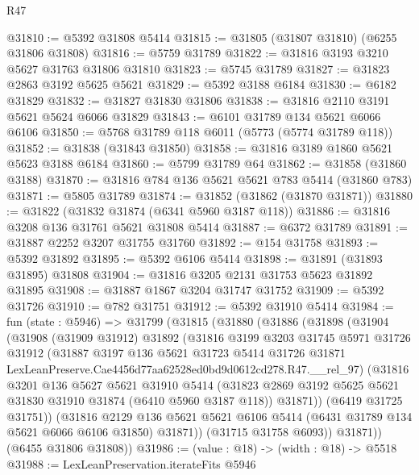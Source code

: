 \begin{lexlean}{R47}
\begin{coremodule}
@31810 := @5392 @31808 @5414
@31815 := @31805 (@31807 @31810) (@6255 @31806 @31808)
@31816 := @5759 @31789
@31822 := @31816 @3193 @3210 @5627 @31763 @31806 @31810
@31823 := @5745 @31789
@31827 := @31823 @2863 @3192 @5625 @5621
@31829 := @5392 @3188 @6184
@31830 := @6182 @31829
@31832 := @31827 @31830 @31806
@31838 := @31816 @2110 @3191 @5621 @5624 @6066 @31829
@31843 := @6101 @31789 @134 @5621 @6066 @6106
@31850 := @5768 @31789 @118 @6011 (@5773 (@5774 @31789 @118))
@31852 := @31838 (@31843 @31850)
@31858 := @31816 @3189 @1860 @5621 @5623 @3188 @6184
@31860 := @5799 @31789 @64
@31862 := @31858 (@31860 @3188)
@31870 := @31816 @784 @136 @5621 @5621 @783 @5414 (@31860 @783)
@31871 := @5805 @31789
@31874 := @31852 (@31862 (@31870 @31871))
@31880 := @31822 (@31832 @31874 (@6341 @5960 @3187 @118))
@31886 := @31816 @3208 @136 @31761 @5621 @31808 @5414
@31887 := @6372 @31789
@31891 := @31887 @2252 @3207 @31755 @31760
@31892 := @154 @31758
@31893 := @5392 @31892
@31895 := @5392 @6106 @5414
@31898 := @31891 (@31893 @31895) @31808
@31904 := @31816 @3205 @2131 @31753 @5623 @31892 @31895
@31908 := @31887 @1867 @3204 @31747 @31752
@31909 := @5392 @31726
@31910 := @782 @31751
@31912 := @5392 @31910 @5414
@31984 := fun (state : @5946) =>
  @31799
    (@31815
      (@31880
        (@31886
          (@31898
            (@31904
              (@31908
                (@31909 @31912)
                @31892
                (@31816
                  @3199
                  @3203
                  @31745
                  @5971
                  @31726
                  @31912
                  (@31887
                    @3197
                    @136
                    @5621
                    @31723
                    @5414
                    @31726
                    @31871
                    LexLeanPreserve.Cae4456d77aa62528ed0bd9d0612cd278.R47.__rel_97)
                  (@31816
                    @3201
                    @136
                    @5627
                    @5621
                    @31910
                    @5414
                    (@31823 @2869 @3192 @5625 @5621 @31830 @31910 @31874 (@6410 @5960 @3187 @118))
                    @31871))
                (@6419 @31725 @31751))
              (@31816
                @2129
                @136
                @5621
                @5621
                @6106
                @5414
                (@6431 @31789 @134 @5621 @6066 @6106 @31850)
                @31871))
            (@31715 @31758 @6093))
          @31871))
      (@6455 @31806 @31808))
@31986 := (value : @18) -> (width : @18) -> @5518
@31988 := LexLeanPreservation.iterateFits @5946

\end{coremodule}
\end{lexlean}
